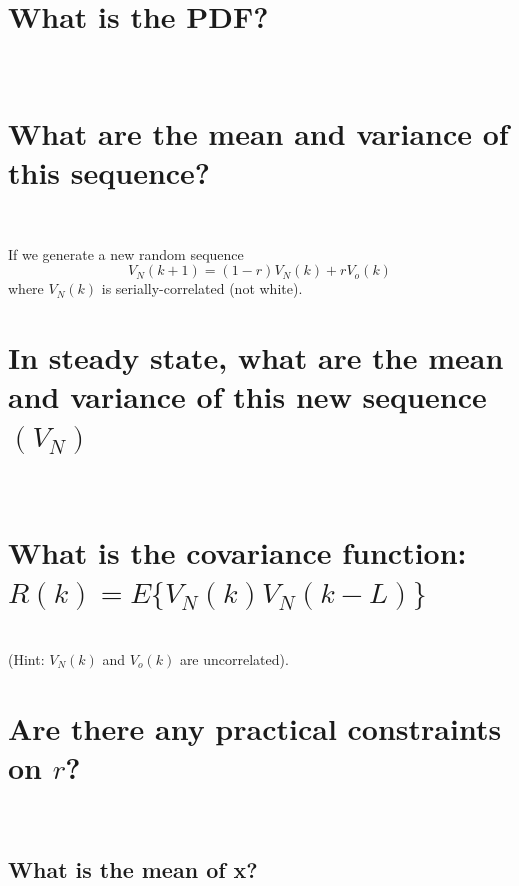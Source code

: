 \documentclass[12pt,letterpaper, onecolumn]{exam}
\begin{document}
\begin{questions}
\begin{parts}
            \part{What is the PDF?}\\
                \solution
            \part{What are the mean and variance of this sequence?}\\
                \solution
                
            If we generate a new random sequence \[V_N(k+1) = (1 - r)V_N(k) + rV_o(k)\]where $V_N(k)$ is serially-correlated (not white).    
            \part{In steady state, what are the mean and variance of this new sequence $(V_N)$}\\
                \solution
            \part{What is the covariance function: $R(k) = E\{V_N(k)V_N(k-L)\}$}\\
                (Hint: $V_N(k)$ and $V_o(k)$ are uncorrelated).\\
                \solution
            \part{Are there any practical constraints on $r$?}\\
                \solution                
        \end{parts}
\clearpage        
        \begin{parts}
            \part{What is the mean of x?}\\
                \solution

\end{parts}
\end{questions}
\end{document}
